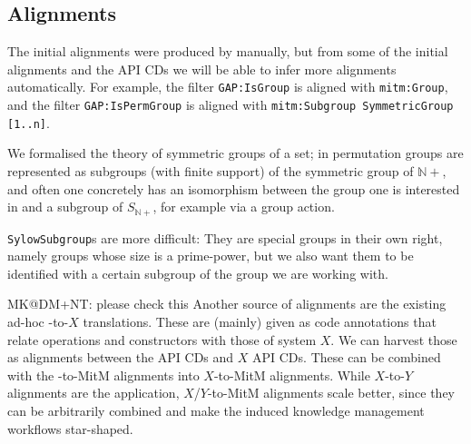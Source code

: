 \subsection{Alignments}

The initial alignments were produced by manually, but from some of the initial alignments
and the \GAP API CDs we will be able to infer more alignments automatically.  For example,
the filter \texttt{GAP:IsGroup} is aligned with
\texttt{mitm:Group}, and the filter \texttt{GAP:IsPermGroup} is aligned with
\texttt{mitm:Subgroup SymmetricGroup [1..n]}.  

We formalised the theory of symmetric groups of a set; in \GAP permutation groups
are represented as subgroups (with finite support) of the symmetric group of
$\mathbb{N}+$, and often one concretely has an isomorphism between the group one
is interested in and a subgroup of $S_{\mathbb{N}+}$, for example
via a group action.

\texttt{SylowSubgroup}s are more difficult: They are special groups in their
own right, namely groups whose size is a prime-power, but we also want them
to be identified with a certain subgroup of the group we are working
with.

\begin{newpart}{MK@DM+NT: please check this }
  Another source of alignments are the existing ad-hoc \Sage-to-$X$ translations. These
  are (mainly) given as \Sage code annotations that relate \Sage operations and
  constructors with those of system $X$. We can harvest those as alignments between
  the \Sage API CDs and $X$ API CDs. These can be combined with the \Sage-to-MitM
  alignments into $X$-to-MitM alignments. While $X$-to-$Y$ alignments are the application,
  $X$/$Y$-to-MitM alignments scale better, since they can be arbitrarily combined and make
  the induced knowledge management workflows star-shaped.
\end{newpart}
